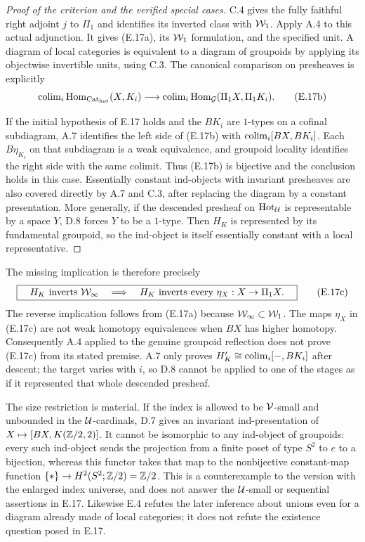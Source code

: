 \begin{proof}[Proof of the criterion and the verified special cases]
C.4 gives the fully faithful right adjoint $j$ to $\Pi_1$ and
identifies its inverted class with $\mathcal W_1$. Apply A.4 to this actual
adjunction. It gives (E.17a), its $\mathcal W_1$ formulation, and the
specified unit. A diagram of local categories is equivalent to a
diagram of groupoids by applying its objectwise invertible units,
using C.3. The canonical comparison on presheaves is explicitly
\[
 \operatorname{colim}_i\operatorname{Hom}_{{\mathrm{Cat}_{\mathrm{hot}}}}(X,K_i)
 \longrightarrow
 \operatorname{colim}_i\operatorname{Hom}_{\mathcal G}(\Pi_1X,\Pi_1K_i).
 \tag{E.17b}
\]

If the initial hypothesis of E.17 holds and the $BK_i$ are
$1$-types on a cofinal subdiagram, A.7 identifies the left side
of (E.17b) with $\operatorname{colim}_i[BX,BK_i]$. Each $B\eta_{K_i}$ on
that subdiagram is a weak equivalence, and groupoid locality
identifies the right side with the same colimit. Thus (E.17b)
is bijective and the conclusion holds in this case. Essentially
constant ind-objects with invariant presheaves are also covered
directly by A.7 and C.3, after replacing the diagram by a constant
presentation. More generally, if the descended presheaf on $\mathrm{Hot}_\mathcal U$ is
representable by a space $Y$, D.8 forces $Y$ to be a $1$-type.
Then $H_K$ is represented by its fundamental groupoid, so the
ind-object is itself essentially constant with a local representative.
\end{proof}

The missing implication is therefore precisely
\[
 \boxed{\quad
 H_K\text{ inverts }\mathcal W_\infty
 \quad\Longrightarrow\quad
 H_K\text{ inverts every }\eta_X:X\to\Pi_1X.
 \quad}
 \tag{E.17c}
\]
The reverse implication follows from (E.17a) because
$\mathcal W_\infty\subset\mathcal W_1$. The maps $\eta_X$ in (E.17c) are
not weak homotopy equivalences when $BX$ has higher homotopy.
Consequently A.4 applied to the genuine groupoid reflection does
not prove (E.17c) from its stated premise. A.7 only proves
$H_K'\cong\operatorname{colim}_i[-,BK_i]$ after descent; the target varies
with $i$, so D.8 cannot be applied to one of the stages as if it
represented that whole descended presheaf.

The size restriction is material. If the index is allowed to be
$\mathcal V$-small and unbounded in the $\mathcal U$-cardinals, D.7 gives an
invariant ind-presentation of $X\mapsto[BX,K(\mathbb Z/2,2)]$.
It cannot be isomorphic to any ind-object of groupoids: every
such ind-object sends the projection from a finite poset of type
$S^2$ to $e$ to a bijection, whereas this functor takes that map
to the nonbijective constant-map function
$\{*\}\to H^2(S^2;\mathbb Z/2)=\mathbb Z/2$. This is a counterexample to
the version with the enlarged index universe, and does not answer
the $\mathcal U$-small or sequential assertions in E.17. Likewise E.4
refutes the later inference about unions even for a diagram already
made of local categories; it does not refute the existence question
posed in E.17.
